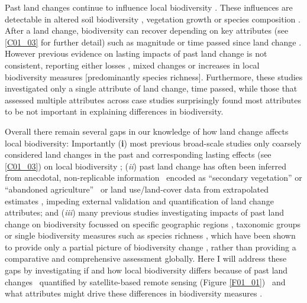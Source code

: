 Past land changes continue to influence local biodiversity \citep{Foster2003}. These influences are detectable in altered soil biodiversity \citep{Jakovac2016,Wood2017}, vegetation growth \citep{Fraterrigo2006} or species composition \citep{Bellemare2002,Ewers2013,Jakovac2016}. After a land change, biodiversity can recover \citep{Chazdon2003} depending on key attributes (see \ref{C01_03} for further detail) such as magnitude or time passed since land change \citep{Martin2013,Fu2017,Jones2018}. However previous evidence on lasting impacts of past land change is not consistent, reporting either losses \citep{Moreno-Mateos2017,Jones2018}, mixed changes \citep{Svensson2012,Thom2016} or increases \citep{Fu2017} in local biodiversity measures [predominantly species richness]. Furthermore, these studies investigated only a single attribute of land change, \eg time passed, while those that assessed multiple attributes \citep{Shackelford2017} across case studies surprisingly found most attributes to be not important in explaining differences in biodiversity.

Overall there remain several gaps in our knowledge of how land change affects local biodiversity: Importantly (\textbf{i}) most previous broad-scale studies only coarsely considered land changes in the past \citep{Alkemade2009,Murphy2014,Newbold2015} and corresponding lasting effects (see \ref{C01_03}) on local biodiversity \citep{Dullinger2013,Hylander2013}; (\textit{ii}) past land change has often been inferred from anecdotal, non-replicable information \textendash\ \ie encoded as “secondary vegetation” \citep{Hudson2014} or “abandoned agriculture” \citep{Gibson2011} \textendash\ or land use/land-cover data from extrapolated estimates \citep{Hurtt2011}, impeding external validation and quantification of land change attributes; and (\textit{iii}) many previous studies investigating impacts of past land change on biodiversity focussed on specific geographic regions \citep{Bellemare2002,Ewers2013,Cousins2015}, taxonomic groups \citep{Hermy2007,Perring2018} or single biodiversity measures such as species richness \citep{Martin2013,Fu2017}, which have been shown to provide only a partial picture of biodiversity change \citep{Su2004,Hillebrand2017}, rather than providing a comparative and comprehensive assessment globally. Here I will address these gaps by investigating if and how local biodiversity differs because of past land changes \textendash\ quantified by satellite-based remote sensing (Figure \ref{F01_01}) \textendash\ and what attributes might drive these differences in biodiversity measures .



